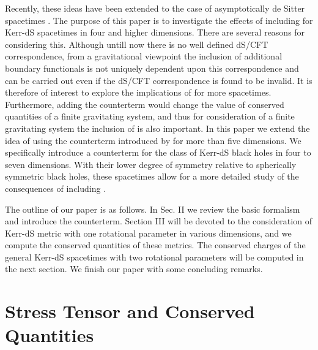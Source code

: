 \documentclass[a4paper,12pt,onecolumn]{revtex4}
\begin{document}
Recently, these ideas have been extended to the case of
asymptotically de Sitter spacetimes \cite{Kl1,Bal2}. The purpose
of this paper is to investigate the effects of including \coordHE{}
for Kerr-dS spacetimes in four and higher dimensions. There are
several reasons for considering this. Although untill now there is
no well defined dS/CFT correspondence, from a gravitational
viewpoint the inclusion of additional boundary functionals is not
uniquely dependent upon this correspondence and can be carried out
even if the dS/CFT correspondence is found to be invalid. It is
therefore of interest to explore the implications of \coordHE{} for
more spacetimes. Furthermore, adding the counterterm would change
the value of conserved quantities of a finite gravitating system,
and thus for consideration of a finite gravitating system the
inclusion of \coordHE{} is also important. In this paper we extend
the idea of using the counterterm introduced by \cite {Kl1,Bal2}
for more than five dimensions. We specifically introduce a
counterterm for the class of Kerr-dS black holes in four to seven
dimensions. With their lower degree of symmetry relative to
spherically symmetric black holes, these spacetimes allow for a
more detailed study of the consequences of including \coordHE{}.

The outline of our paper is as follows. In Sec. II we review the
basic formalism and introduce the counterterm. Section III will be
devoted to the consideration of Kerr-dS metric with one rotational
parameter in various dimensions, and we compute the conserved
quantities of these metrics. The conserved charges of the general
Kerr-dS spacetimes with two rotational parameters will be computed
in the next section. We finish our paper with some concluding
remarks.

\section{Stress Tensor and Conserved Quantities\label{StrTen}}
\end{document}
